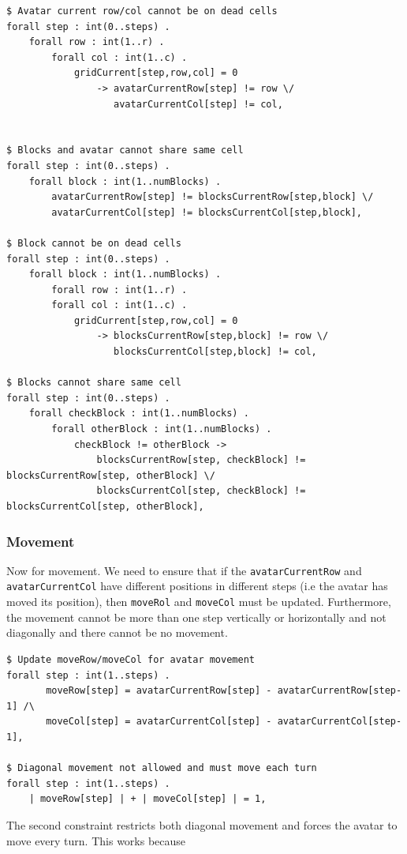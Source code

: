 \documentclass{article}
\begin{document}
\begin{lstlisting}
$ Avatar current row/col cannot be on dead cells
forall step : int(0..steps) .
    forall row : int(1..r) .
        forall col : int(1..c) .
	    	gridCurrent[step,row,col] = 0 
	    		-> avatarCurrentRow[step] != row \/ 
	    		   avatarCurrentCol[step] != col,


$ Blocks and avatar cannot share same cell
forall step : int(0..steps) .
    forall block : int(1..numBlocks) .
        avatarCurrentRow[step] != blocksCurrentRow[step,block] \/
		avatarCurrentCol[step] != blocksCurrentCol[step,block],

$ Block cannot be on dead cells
forall step : int(0..steps) .
    forall block : int(1..numBlocks) .
        forall row : int(1..r) .
	    forall col : int(1..c) .
	        gridCurrent[step,row,col] = 0 
	        	-> blocksCurrentRow[step,block] != row \/
				   blocksCurrentCol[step,block] != col,

$ Blocks cannot share same cell				       
forall step : int(0..steps) .
    forall checkBlock : int(1..numBlocks) .
        forall otherBlock : int(1..numBlocks) .
	    	checkBlock != otherBlock ->
	        	blocksCurrentRow[step, checkBlock] != blocksCurrentRow[step, otherBlock] \/
				blocksCurrentCol[step, checkBlock] != blocksCurrentCol[step, otherBlock],
\end{lstlisting}


\subsubsection{Movement}
Now for movement. We need to ensure that if the \texttt{avatarCurrentRow} and \texttt{avatarCurrentCol} have different positions in different steps (i.e the avatar has moved its position), then \texttt{moveRol} and \texttt{moveCol} must be updated. Furthermore, the movement cannot be more than one step vertically or horizontally and not diagonally and there cannot be no movement.

\begin{lstlisting}
$ Update moveRow/moveCol for avatar movement
forall step : int(1..steps) .
       moveRow[step] = avatarCurrentRow[step] - avatarCurrentRow[step-1] /\
       moveCol[step] = avatarCurrentCol[step] - avatarCurrentCol[step-1],

$ Diagonal movement not allowed and must move each turn
forall step : int(1..steps) .
    | moveRow[step] | + | moveCol[step] | = 1,
\end{lstlisting}
The second constraint restricts both diagonal movement and forces the avatar to move every turn. This works because
\end{document}
